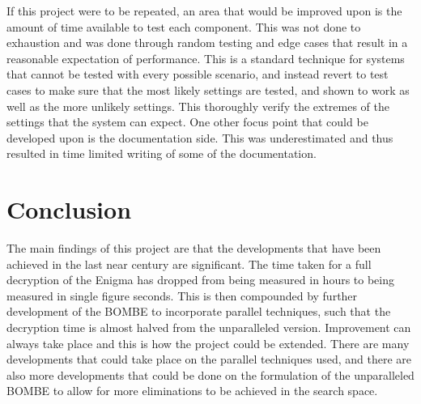 \documentclass[12pt,a4paper]{article}
\begin{document}
If this project were to be repeated, an area that would be improved upon is the amount of time available to test each component. This was not done to exhaustion and was done through random testing and edge cases that result in a reasonable expectation of performance. This is a standard technique for systems that cannot be tested with every possible scenario, and instead revert to test cases to make sure that the most likely settings are tested, and shown to work as well as the more unlikely settings. This thoroughly verify the extremes of the settings that the system can expect. One other focus point that could be developed upon is the documentation side. This was underestimated and thus resulted in time limited writing of some of the documentation.

\section{Conclusion}

The main findings of this project are that the developments that have been achieved in the last near century are significant. The time taken for a full decryption of the Enigma has dropped from being measured in hours to being measured in single figure seconds. This is then compounded by further development of the BOMBE to incorporate parallel techniques, such that the decryption time is almost halved from the unparalleled version. Improvement can always take place and this is how the project could be extended. There are many developments that could take place on the parallel techniques used, and there are also more developments that could be done on the formulation of the unparalleled BOMBE to allow for more eliminations to be achieved in the search space.



\nocite{*}
\end{document}
